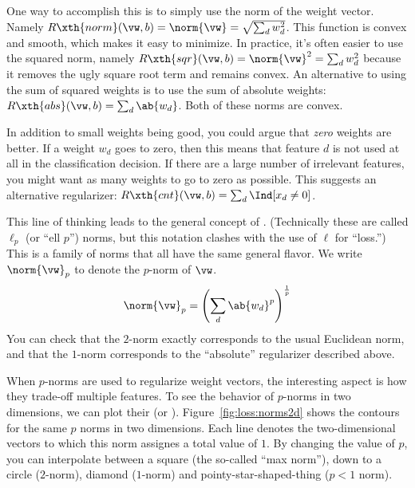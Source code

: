 One way to accomplish this is to simply use the norm of the weight
vector.  Namely $R\xth{norm}(\vw,b) = \norm{\vw} = \sqrt{\sum_d
  w_d^2}$.  This function is convex and smooth, which makes it easy to
minimize.  In practice, it's often easier to use the squared norm,
namely $R\xth{sqr}(\vw,b) = \norm{\vw}^2 = \sum_d w_d^2$ because it
removes the ugly square root term and remains convex.  An alternative
to using the sum of squared weights is to use the sum of absolute
weights: $R\xth{abs}(\vw,b) = \sum_d \ab{w_d}$.  Both of these norms
are convex.


In addition to small weights being good, you could argue that
\emph{zero} weights are better.  If a weight $w_d$ goes to zero, then
this means that feature $d$ is not used at all in the classification
decision.  If there are a large number of irrelevant features, you
might want as many weights to go to zero as possible.  This suggests
an alternative regularizer: $R\xth{cnt}(\vw,b) = \sum_d \Ind[x_d \neq
0]$.


This line of thinking leads to the general concept of
.  (Technically these are called $\ell_p$ (or ``ell
$p$'') norms, but this notation clashes with the use of $\ell$ for
``loss.'')  This is a family of norms that all have the same general
flavor.  We write $\norm{\vw}_p$ to denote the $p$-norm of $\vw$.
%
\begin{equation} \label{eq:loss:l}
  \norm{\vw}_p = \left( \sum_d \ab{w_d}^p \right)^{\frac 1 p}
\end{equation}
%
You can check that the $2$-norm exactly corresponds to the usual
Euclidean norm, and that the $1$-norm corresponds to the ``absolute''
regularizer described above.



When $p$-norms are used to regularize weight vectors, the interesting
aspect is how they trade-off multiple features.  To see the behavior
of $p$-norms in two dimensions, we can plot their 
(or ).  Figure~\ref{fig:loss:norms2d} shows the
contours for the same $p$ norms in two dimensions.  Each line denotes
the two-dimensional vectors to which this norm assignes a total value
of $1$.  By changing the value of $p$, you can interpolate between a
square (the so-called ``max norm''), down to a circle ($2$-norm),
diamond ($1$-norm) and pointy-star-shaped-thing ($p<1$ norm).

